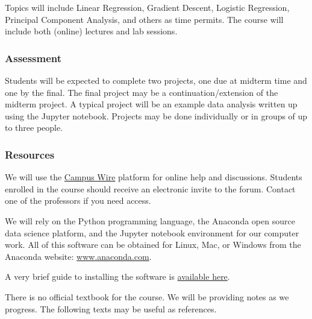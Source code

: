 \documentclass[
]{article}
\begin{document}
Topics will include Linear Regression, Gradient Descent, Logistic
Regression, Principal Component Analysis, and others as time permits.
The course will include both (online) lectures and lab sessions.

\hypertarget{assessment}{%
\subsubsection{Assessment}\label{assessment}}

Students will be expected to complete two projects, one due at midterm
time and one by the final. The final project may be a
continuation/extension of the midterm project. A typical project will be
an example data analysis written up using the Jupyter notebook. Projects
may be done individually or in groups of up to three people.

\hypertarget{resources}{%
\subsubsection{Resources}\label{resources}}

We will use the \href{http://campuswire.com}{Campus Wire} platform for
online help and discussions. Students enrolled in the course should
receive an electronic invite to the forum. Contact one of the professors
if you need access.

We will rely on the Python programming language, the Anaconda open
source data science platform, and the Jupyter notebook environment for
our computer work. All of this software can be obtained for Linux, Mac,
or Windows from the Anaconda website:
\href{http://www.anaconda.com}{www.anaconda.com}.

A very brief guide to installing the software is
\href{installing.md}{available here}.

There is no official textbook for the course. We will be providing notes
as we progress. The following texts may be useful as references.
\end{document}
